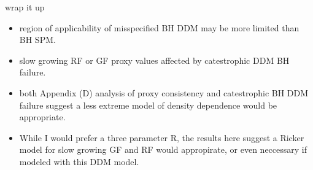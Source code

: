 {\color{red} wrap it up}
\begin{itemize}
	\item region of applicability of misspecified BH DDM may be more limited than BH SPM.
       	\item slow growing RF or GF proxy values affected by catestrophic DDM BH failure. 
       	\item both Appendix (D) analysis of proxy consistency and catestrophic BH DDM failure suggest a less extreme model of density dependence would be appropriate.  
       	\item While I would prefer a three parameter R, the results here suggest a Ricker model for slow growing GF and RF would appropirate, or even neccessary if modeled with this DDM model.
\end{itemize}

